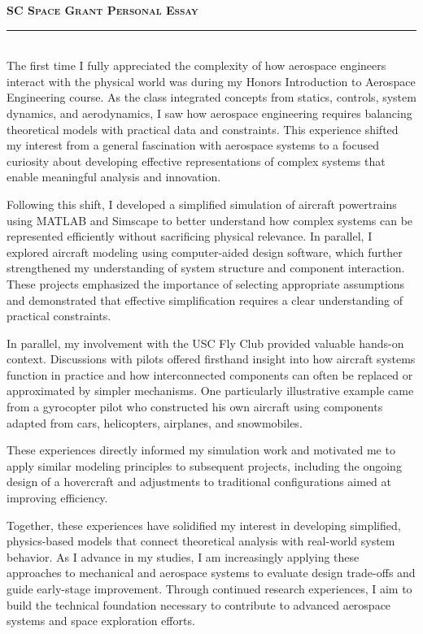 \documentclass[12pt]{article}
\begin{document}
{\color{garnet}\large\textbf{\textsc{SC Space Grant Personal Essay}}}\\[-0.8em]
{\color{garnet}\rule{\textwidth}{0.5pt}}\\[0.2em]
The first time I fully appreciated the complexity of how aerospace engineers interact with the physical world was during my Honors Introduction to Aerospace Engineering course. As the class integrated concepts from statics, controls, system dynamics, and aerodynamics, I saw how aerospace engineering requires balancing theoretical models with practical data and constraints. This experience shifted my interest from a general fascination with aerospace systems to a focused curiosity about developing effective representations of complex systems that enable meaningful analysis and innovation.

Following this shift, I developed a simplified simulation of aircraft powertrains using MATLAB and Simscape to better understand how complex systems can be represented efficiently without sacrificing physical relevance. In parallel, I explored aircraft modeling using computer-aided design software, which further strengthened my understanding of system structure and component interaction. These projects emphasized the importance of selecting appropriate assumptions and demonstrated that effective simplification requires a clear understanding of practical constraints.

In parallel, my involvement with the USC Fly Club provided valuable hands-on context. Discussions with pilots offered firsthand insight into how aircraft systems function in practice and how interconnected components can often be replaced or approximated by simpler mechanisms. One particularly illustrative example came from a gyrocopter pilot who constructed his own aircraft using components adapted from cars, helicopters, airplanes, and snowmobiles.

These experiences directly informed my simulation work and motivated me to apply similar modeling principles to subsequent projects, including the ongoing design of a hovercraft and adjustments to traditional configurations aimed at improving efficiency.

Together, these experiences have solidified my interest in developing simplified, physics-based models that connect theoretical analysis with real-world system behavior. As I advance in my studies, I am increasingly applying these approaches to mechanical and aerospace systems to evaluate design trade-offs and guide early-stage improvement. Through continued research experiences, I aim to build the technical foundation necessary to contribute to advanced aerospace systems and space exploration efforts.
\end{document}
